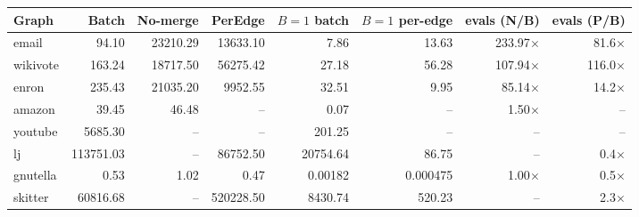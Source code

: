 \begin{tabular}{lrrrrrrr}
\toprule
Graph & Batch & No-merge & PerEdge & $B{=}1$ batch & $B{=}1$ per-edge & evals (N/B) & evals (P/B) \\
\midrule
email & 94.10 & 23210.29 & 13633.10 & 7.86 & 13.63 & 233.97$\times$ & 81.6$\times$ \\
wikivote & 163.24 & 18717.50 & 56275.42 & 27.18 & 56.28 & 107.94$\times$ & 116.0$\times$ \\
enron & 235.43 & 21035.20 & 9952.55 & 32.51 & 9.95 & 85.14$\times$ & 14.2$\times$ \\
amazon & 39.45 & 46.48 & -- & 0.07 & -- & 1.50$\times$ & -- \\
youtube & 5685.30 & -- & -- & 201.25 & -- & -- & -- \\
lj & 113751.03 & -- & 86752.50 & 20754.64 & 86.75 & -- & 0.4$\times$ \\
gnutella & 0.53 & 1.02 & 0.47 & 0.00182 & 0.000475 & 1.00$\times$ & 0.5$\times$ \\
skitter & 60816.68 & -- & 520228.50 & 8430.74 & 520.23 & -- & 2.3$\times$ \\
\bottomrule
\end{tabular}
